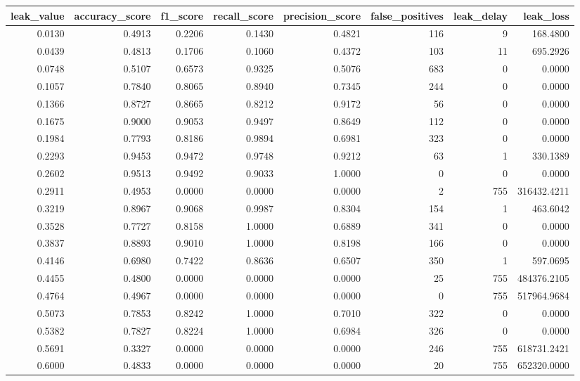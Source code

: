 \begin{tabular}{rrrrrrrr}
\toprule
leak\_value & accuracy\_score & f1\_score & recall\_score & precision\_score & false\_positives & leak\_delay & leak\_loss \\
\midrule
0.0130 & 0.4913 & 0.2206 & 0.1430 & 0.4821 & 116 & 9 & 168.4800 \\
0.0439 & 0.4813 & 0.1706 & 0.1060 & 0.4372 & 103 & 11 & 695.2926 \\
0.0748 & 0.5107 & 0.6573 & 0.9325 & 0.5076 & 683 & 0 & 0.0000 \\
0.1057 & 0.7840 & 0.8065 & 0.8940 & 0.7345 & 244 & 0 & 0.0000 \\
0.1366 & 0.8727 & 0.8665 & 0.8212 & 0.9172 & 56 & 0 & 0.0000 \\
0.1675 & 0.9000 & 0.9053 & 0.9497 & 0.8649 & 112 & 0 & 0.0000 \\
0.1984 & 0.7793 & 0.8186 & 0.9894 & 0.6981 & 323 & 0 & 0.0000 \\
0.2293 & 0.9453 & 0.9472 & 0.9748 & 0.9212 & 63 & 1 & 330.1389 \\
0.2602 & 0.9513 & 0.9492 & 0.9033 & 1.0000 & 0 & 0 & 0.0000 \\
0.2911 & 0.4953 & 0.0000 & 0.0000 & 0.0000 & 2 & 755 & 316432.4211 \\
0.3219 & 0.8967 & 0.9068 & 0.9987 & 0.8304 & 154 & 1 & 463.6042 \\
0.3528 & 0.7727 & 0.8158 & 1.0000 & 0.6889 & 341 & 0 & 0.0000 \\
0.3837 & 0.8893 & 0.9010 & 1.0000 & 0.8198 & 166 & 0 & 0.0000 \\
0.4146 & 0.6980 & 0.7422 & 0.8636 & 0.6507 & 350 & 1 & 597.0695 \\
0.4455 & 0.4800 & 0.0000 & 0.0000 & 0.0000 & 25 & 755 & 484376.2105 \\
0.4764 & 0.4967 & 0.0000 & 0.0000 & 0.0000 & 0 & 755 & 517964.9684 \\
0.5073 & 0.7853 & 0.8242 & 1.0000 & 0.7010 & 322 & 0 & 0.0000 \\
0.5382 & 0.7827 & 0.8224 & 1.0000 & 0.6984 & 326 & 0 & 0.0000 \\
0.5691 & 0.3327 & 0.0000 & 0.0000 & 0.0000 & 246 & 755 & 618731.2421 \\
0.6000 & 0.4833 & 0.0000 & 0.0000 & 0.0000 & 20 & 755 & 652320.0000 \\
\bottomrule
\end{tabular}
